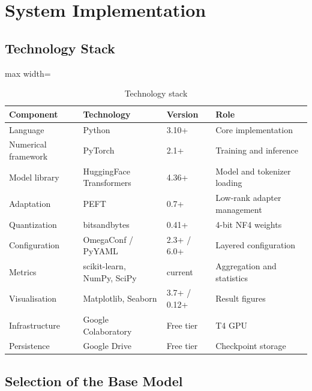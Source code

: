 \documentclass[12pt,a4paper]{report}
\begin{document}
\chapter{System Implementation}

\section{Technology Stack}

\begin{table}[htbp]
\centering
\caption{Technology stack}
\begin{adjustbox}{max width=\textwidth}
\begin{tabular}{>{\raggedright\arraybackslash}p{3cm} p{3cm} p{2cm} p{4cm}}
\toprule
\textbf{Component} & \textbf{Technology} & \textbf{Version} & \textbf{Role} \\
\midrule
Language & Python & 3.10+ & Core implementation \\
Numerical framework & PyTorch & 2.1+ & Training and inference \\
Model library & HuggingFace Transformers & 4.36+ & Model and tokenizer loading \\
Adaptation & PEFT & 0.7+ & Low-rank adapter management \\
Quantization & bitsandbytes & 0.41+ & 4-bit NF4 weights \\
Configuration & OmegaConf / PyYAML & 2.3+ / 6.0+ & Layered configuration \\
Metrics & scikit-learn, NumPy, SciPy & current & Aggregation and statistics \\
Visualisation & Matplotlib, Seaborn & 3.7+ / 0.12+ & Result figures \\
Infrastructure & Google Colaboratory & Free tier & T4 GPU \\
Persistence & Google Drive & Free tier & Checkpoint storage \\
\bottomrule
\end{tabular}
\end{adjustbox}
\end{table}

\section{Selection of the Base Model}
\end{document}
